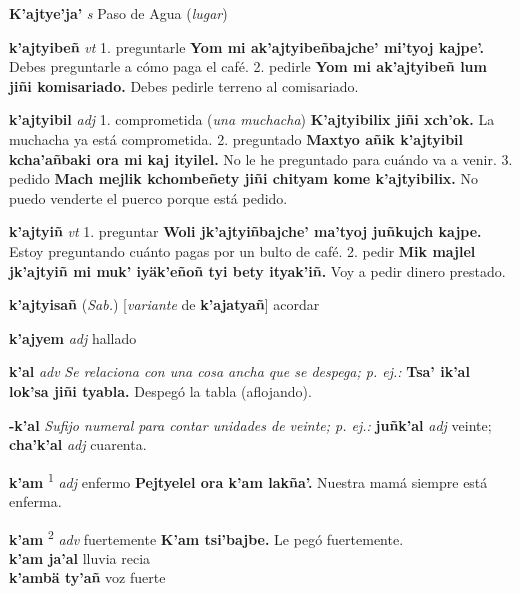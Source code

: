 \documentclass[10pt]{scrbook}
\newcommand{\entry}[1]{\textbf{#1}}
\newcommand{\onedefinition}[1]{#1.}
\newcommand{\defsuperscript}[1]{\textsuperscript{#1}}
\newcommand{\nontranslationdef}[1]{\textit{#1}}
\newcommand{\partofspeech}[1]{\textit{#1}}
\newcommand{\spanishtranslation}[1]{#1}
\newcommand{\clarification}[1]{(\textit{#1})}
\newcommand{\cholexample}[1]{\textbf{#1}}
\newcommand{\exampletranslation}[1]{#1}
\newcommand{\relevantdialect}[1]{(\textit{#1})}
\newcommand{\secondaryentry}[1]{\\\textbf{#1}}
\newcommand{\secondtranslation}[1]{#1}
\newcommand{\conjugationtense}[1]{[\textit{#1}}
\newcommand{\conjugationverb}[1]{de \textbf{#1}]}
\begin{document}
\begin{multicols}{2}
\entry{K'ajtye'ja'}
\partofspeech{s}
\spanishtranslation{Paso de Agua}
\clarification{lugar}

\entry{k'ajtyibeñ}
\partofspeech{vt}
\onedefinition{1}
\spanishtranslation{preguntarle}
\cholexample{Yom mi ak'ajtyibeñbajche' mi'tyoj kajpe'.}
\exampletranslation{Debes preguntarle a cómo paga el café.}
\onedefinition{2}
\spanishtranslation{pedirle}
\cholexample{Yom mi ak'ajtyibeñ lum jiñi komisariado.}
\exampletranslation{Debes pedirle terreno al comisariado.}

\entry{k'ajtyibil}
\partofspeech{adj}
\onedefinition{1}
\spanishtranslation{comprometida}
\clarification{una muchacha}
\cholexample{K'ajtyibilix jiñi xch'ok.}
\exampletranslation{La muchacha ya está comprometida.}
\onedefinition{2}
\spanishtranslation{preguntado}
\cholexample{Maxtyo añik k'ajtyibil kcha'añbaki ora mi kaj ityilel.}
\exampletranslation{No le he preguntado para cuándo va a venir.}
\onedefinition{3}
\spanishtranslation{pedido}
\cholexample{Mach mejlik kchombeñety jiñi chityam kome k'ajtyibilix.}
\exampletranslation{No puedo venderte el puerco porque está pedido.}

\entry{k'ajtyiñ}
\partofspeech{vt}
\onedefinition{1}
\spanishtranslation{preguntar}
\cholexample{Woli jk'ajtyiñbajche' ma'tyoj juñkujch kajpe.}
\exampletranslation{Estoy preguntando cuánto pagas por un bulto de café.}
\onedefinition{2}
\spanishtranslation{pedir}
\cholexample{Mik majlel jk'ajtyiñ mi muk' iyäk'eñoñ tyi bety ityak'iñ.}
\exampletranslation{Voy a pedir dinero prestado.}

\entry{k'ajtyisañ}
\relevantdialect{Sab.}
\conjugationtense{variante}
\conjugationverb{k'ajatyañ}
\spanishtranslation{acordar}

\entry{k'ajyem}
\partofspeech{adj}
\spanishtranslation{hallado}

\entry{k'al}
\partofspeech{adv}
\nontranslationdef{Se relaciona con una cosa ancha que se despega; p. ej.:}
\cholexample{Tsa' ik'al lok'sa jiñi tyabla.}
\exampletranslation{Despegó la tabla (aflojando).}

\entry{-k'al}
\nontranslationdef{Sufijo numeral para contar unidades de veinte; p. ej.:}
\cholexample{juñk'al}
\partofspeech{adj}
\exampletranslation{veinte;}
\cholexample{cha'k'al}
\partofspeech{adj}
\exampletranslation{cuarenta.}

\entry{k'am}
\defsuperscript{1}
\partofspeech{adj}
\spanishtranslation{enfermo}
\cholexample{Pejtyelel ora k'am lakña'.}
\exampletranslation{Nuestra mamá siempre está enferma.}

\entry{k'am}
\defsuperscript{2}
\partofspeech{adv}
\spanishtranslation{fuertemente}
\cholexample{K'am tsi'bajbe.}
\exampletranslation{Le pegó fuertemente.}
\secondaryentry{k'am ja'al}
\secondtranslation{lluvia recia}
\secondaryentry{k'ambä ty'añ}
\secondtranslation{voz fuerte}


\end{multicols}
\end{document}
